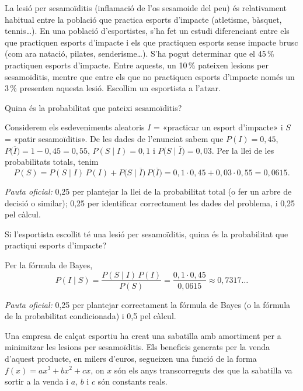 La lesió per sesamoïditis (inflamació de l'os sesamoide del peu) és relativament habitual entre la població que
practica esports d'impacte (atletisme, bàsquet, tennis\ldots). En una població d'esportistes, s'ha fet un estudi
diferenciant entre els que practiquen esports d'impacte i els que practiquen esports sense impacte brusc (com
ara natació, pilates, senderisme\ldots). S'ha pogut determinar que el 45\,\% practiquen esports d'impacte. Entre
aquests, un 10\,\% pateixen lesions per sesamoïditis, mentre que entre els que no practiquen esports d'impacte
només un 3\,\% presenten aquesta lesió. Escollim un esportista a l'atzar.

\begin{apartats}

Quina és la probabilitat que pateixi sesamoïditis?

\begin{solucio}
Considerem els esdeveniments aleatoris $I$ = «practicar un esport d'impacte» i $S$ = «patir sesamoïditis». De
les dades de l'enunciat sabem que $P(I)=0{,}45$, $P\bigl(\overline{I}\bigr)=1-0{,}45=0{,}55$, $P(S\mid I)=0{,}1$ i
$P\bigl(S\mid\overline{I}\bigr)=0{,}03$. Per la llei de les probabilitats totals, tenim
\[
P(S)=P(S\mid I)\,P(I)+P\bigl(S\mid\overline{I}\bigr)\,P\bigl(\overline{I}\bigr)=0{,}1\cdot0{,}45+0{,}03\cdot0{,}55=0{,}0615 .
\]

\textit{Pauta oficial:} 0,25 per plantejar la llei de la probabilitat total (o fer un arbre de decisió o
similar); 0,25 per identificar correctament les dades del problema, i 0,25 pel càlcul.
\end{solucio}

Si l'esportista escollit té una lesió per sesamoïditis, quina és la probabilitat que practiqui esports
d'impacte?

\begin{solucio}
Per la fórmula de Bayes,
\[
P(I\mid S)=\frac{P(S\mid I)\,P(I)}{P(S)}=\frac{0{,}1\cdot0{,}45}{0{,}0615}\approx0{,}7317\ldots
\]

\textit{Pauta oficial:} 0,25 per plantejar correctament la fórmula de Bayes (o la fórmula de la probabilitat
condicionada) i 0,5 pel càlcul.
\end{solucio}

Una empresa de calçat esportiu ha creat una sabatilla amb amortiment per a minimitzar les lesions per
sesamoïditis. Els beneficis generats per la venda d'aquest producte, en milers d'euros, segueixen una funció
de la forma $f(x)=ax^3+bx^2+cx$, on $x$ són els anys transcorreguts des que la sabatilla va sortir a la venda i
$a$, $b$ i $c$ són constants reals.


\end{apartats}
